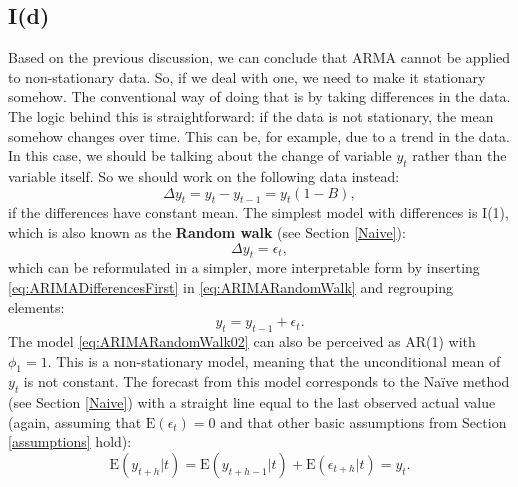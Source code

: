 \documentclass[
]{book}
\theoremstyle{definition}
\theoremstyle{definition}
\theoremstyle{definition}
\theoremstyle{definition}
\theoremstyle{remark}
\begin{document}
\hypertarget{Differences}{%
\subsection{I(d)}\label{Differences}}

Based on the previous discussion, we can conclude that ARMA cannot be applied to non-stationary data. So, if we deal with one, we need to make it stationary somehow. The conventional way of doing that is by taking differences in the data. The logic behind this is straightforward: if the data is not stationary, the mean somehow changes over time. This can be, for example, due to a trend in the data. In this case, we should be talking about the change of variable \(y_t\) rather than the variable itself. So we should work on the following data instead:
\begin{equation}
  \Delta y_t = y_t -y_{t-1} = y_t (1 -B),
  \label{eq:ARIMADifferencesFirst}
\end{equation}
if the differences have constant mean. The simplest model with differences is I(1), which is also known as the \textbf{Random walk} (see Section \ref{Naive}):
\begin{equation}
  \Delta y_t = \epsilon_t,
  \label{eq:ARIMARandomWalk}
\end{equation}
which can be reformulated in a simpler, more interpretable form by inserting \eqref{eq:ARIMADifferencesFirst} in \eqref{eq:ARIMARandomWalk} and regrouping elements:
\begin{equation}
  y_t = y_{t-1} + \epsilon_t.
  \label{eq:ARIMARandomWalk02}
\end{equation}
The model \eqref{eq:ARIMARandomWalk02} can also be perceived as AR(1) with \(\phi_1=1\). This is a non-stationary model, meaning that the unconditional mean of \(y_t\) is not constant. The forecast from this model corresponds to the Naïve method (see Section \ref{Naive}) with a straight line equal to the last observed actual value (again, assuming that \(\mathrm{E}(\epsilon_{t})=0\) and that other basic assumptions from Section \ref{assumptions} hold):
\begin{equation}
  \mathrm{E}(y_{t+h}|t) = \mathrm{E}(y_{t+h-1}|t) + \mathrm{E}(\epsilon_{t+h}|t) = y_{t} .
  \label{eq:ARIMARandomWalkForecast}
\end{equation}
\end{document}
